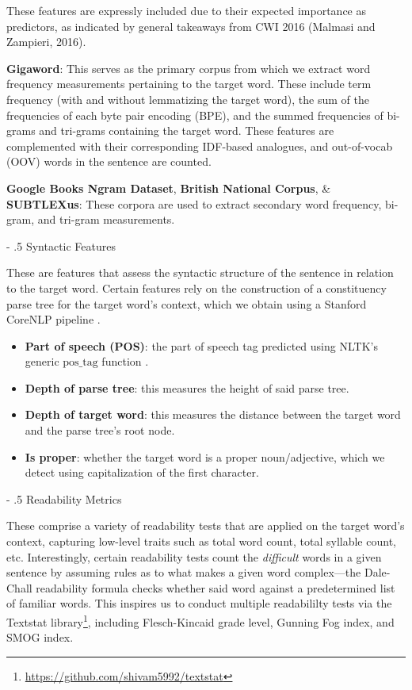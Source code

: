 \documentclass[11pt,a4paper]{article}
\makeatletter
\renewcommand\paragraph{%
    \@startsection{paragraph}{4}{0mm}%
        {-\baselineskip}%
        {.5\baselineskip}%
        {\normalfont\normalsize\bfseries}}
\makeatother
\begin{document}
These features are expressly included due to their expected  importance as predictors, as indicated by general takeaways from CWI 2016 (Malmasi and Zampieri, 2016). 

\textbf{Gigaword}: This serves as the primary corpus from which we extract word frequency measurements pertaining to the target word. These include term frequency (with and without lemmatizing the target word), the sum of the frequencies of each byte pair encoding (BPE), and the summed frequencies of bi-grams and tri-grams containing the target word. These features are complemented with their corresponding IDF-based analogues, and out-of-vocab (OOV) words in the sentence are counted.

\textbf{Google Books Ngram Dataset}, \textbf{British National Corpus}, \& \textbf{SUBTLEXus}: These corpora are used to extract secondary word frequency, bi-gram, and tri-gram measurements.

\paragraph{Syntactic Features}

These are features that assess the syntactic structure of the sentence in relation to the target word. Certain features rely on the construction of a constituency parse tree for the target word's context, which we obtain using a Stanford CoreNLP pipeline \citep{manning-EtAl:2014:P14-5}.

\begin{itemize}
  \item \textbf{Part of speech (POS)}: the part of speech tag predicted using NLTK's generic $\text{pos\_tag}$ function \citep{Loper02nltk:the}.
  \item \textbf{Depth of parse tree}: this measures the height of said parse tree.
  \item \textbf{Depth of target word}: this measures the distance between the target word and the parse tree's root node.
  \item \textbf{Is proper}: whether the target word is a proper noun/adjective, which we detect using capitalization of the first character.
\end{itemize}

\paragraph{Readability Metrics}

These comprise a variety of readability tests that are applied on the target word's context, capturing low-level traits such as total word count, total syllable count, etc. Interestingly, certain readability tests count the \textit{difficult} words in a given sentence by assuming rules as to what makes a given word complex—the Dale-Chall readability formula \citep{10.2307/1473669} checks whether said word against a predetermined list of familiar words. This inspires us to conduct multiple readabililty tests via the Textstat library\footnote{\url{https://github.com/shivam5992/textstat}}, including Flesch-Kincaid grade level, Gunning Fog index, and SMOG index.
\end{document}
